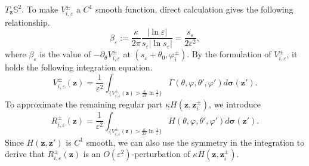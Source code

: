 \documentclass[12pt,reqno]{amsart}
\numberwithin{equation}{section}
\theoremstyle{definition}
\theoremstyle{remark}
\begin{document}
	$T_{\boldsymbol z}{\mathbb S^2}$. To make $V_{i,\varepsilon}^\pm$ a $C^1$ smooth function, direct calculation gives the following relationship.
	\begin{equation}\label{2-1}
		\beta_\varepsilon:=\frac{\kappa}{2\pi}\frac{|\ln\varepsilon|}{s_\varepsilon|\ln s_\varepsilon|}=\frac{s_\varepsilon}{2\varepsilon^2},
	\end{equation}
	where $\beta_\varepsilon$ is the value of $-\partial_\theta V_{i,\varepsilon}^\pm$ at $(s_\varepsilon+\theta_0,\varphi_i^\pm)$. By the formulation of $V_{i,\varepsilon}^\pm$, it holds the following integration equation.
	\begin{equation*}
	   V^\pm_{i,\varepsilon}(\boldsymbol z)=\frac{1}{\varepsilon^2}\int_{\{V^\pm_{i,\varepsilon}(\boldsymbol z)>\frac{\kappa}{2\pi}\ln\frac{1}{\varepsilon}\}} \Gamma(\theta,\varphi,\theta',\varphi')d\boldsymbol \sigma(\boldsymbol z').
	\end{equation*}
	To approximate the remaining regular part $\kappa H(\boldsymbol z, \boldsymbol z_i^\pm)$, we introduce
	\begin{equation*}
		R^\pm_{i,\varepsilon}(\boldsymbol z)=\frac{1}{\varepsilon^2}\int_{\{V^\pm_{i,\varepsilon}(\boldsymbol z)>\frac{\kappa}{2\pi}\ln\frac{1}{\varepsilon}\}} H(\theta,\varphi,\theta',\varphi')d\boldsymbol \sigma(\boldsymbol z').
	\end{equation*} 
    Since $H(\boldsymbol z,\boldsymbol z')$ is $C^1$ smooth, we can also use the symmetry in the integration to derive that $R^\pm_{i,\varepsilon}(\boldsymbol z)$ is an $O(\varepsilon^2)$-perturbation of $\kappa H(\boldsymbol z,\boldsymbol z^\pm_i)$. 
    
\end{document}
